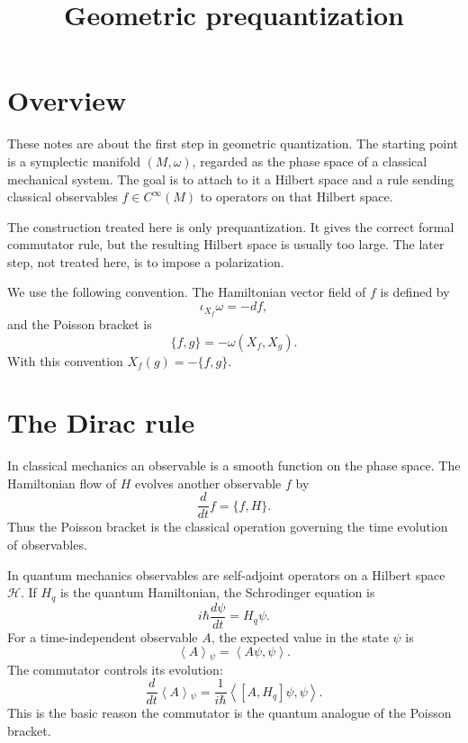 



\title{Geometric prequantization}
\maketitle

\label{section-phantom}

\tableofcontents

\section{Overview}
\label{section-overview}

\noindent
These notes are about the first step in
geometric quantization.  The starting point
is
a symplectic manifold $(M,\omega)$,
regarded as
the phase space of a classical mechanical
system.  The goal is to attach to it a
Hilbert
space and a rule sending classical
observables
$f \in C^{\infty}(M)$ to operators on that
Hilbert space.

\medskip\noindent
The construction treated here is only
prequantization.  It gives the correct formal
commutator rule, but the resulting Hilbert
space is usually too large.  The later step,
not treated here, is to impose a
polarization.

\medskip\noindent
We use the following convention.  The
Hamiltonian vector field of $f$ is defined by
$$
\iota_{X_f}\omega=-df,
$$
and the Poisson bracket is
$$
\{f,g\}=-\omega(X_f,X_g).
$$
With this convention $X_f(g)=-\{f,g\}$.

\section{The Dirac rule}
\label{section-dirac-rule}

\noindent
In classical mechanics an observable is a
smooth function on the phase space.  The
Hamiltonian flow of $H$ evolves another
observable $f$ by
$$
\frac{d}{dt}f=\{f,H\}.
$$
Thus the Poisson bracket is the classical
operation governing the time evolution of
observables.

\medskip\noindent
In quantum mechanics observables are
self-adjoint operators on a Hilbert space
$\mathcal H$.  If $H_q$ is the quantum
Hamiltonian, the Schrodinger equation is
$$
i\hbar\frac{d\psi}{dt}=H_q\psi.
$$
For a time-independent observable $A$, the
expected value in the state $\psi$ is
$$
\left\langle{} A \right\rangle{}_\psi
=\left\langle{} A\psi,\psi \right\rangle{}.
$$
The commutator controls its evolution:
$$
\frac{d}{dt}
\left\langle{} A \right\rangle{}_\psi
=
\frac{1}{i\hbar}
\left\langle{} [A,H_q]\psi,\psi
\right\rangle{}.
$$
This is the basic reason the commutator is
the quantum analogue of the Poisson bracket.

